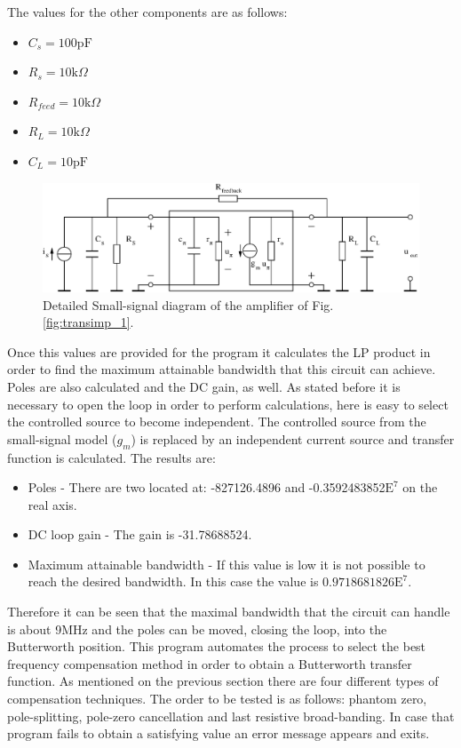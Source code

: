 \documentclass[conference]{IEEEtran}
\begin{document}
The values for the other components are as follows:

\begin{itemize}
\item $C_s=100\text{pF}$
\item $R_s=10\text{k}\Omega$
\item $R_{feed}=10\text{k}\Omega$
\item $R_L=10\text{k}\Omega$
\item $C_L=10\text{pF}$
\end{itemize}
 
\begin{figure}[hbtp]
	\centering
	\includegraphics[scale=.45]{figures/transimp_2.eps}
	\caption{Detailed Small-signal diagram of the amplifier of Fig. \ref{fig:transimp_1}.}
	\label{fig:transimp_2}
\end{figure}

Once this values are provided for the program it calculates the LP product in order to find the maximum attainable bandwidth that this circuit can achieve. Poles are also calculated and the DC gain, as well. As stated before it is necessary to open the loop in order to perform calculations, here is easy to select the controlled source to become independent. The controlled source from the small-signal model ($g_m$) is replaced by an independent current source and transfer function is calculated. The results are:

\begin{itemize}
\item Poles - There are two located at: -827126.4896 and \mbox{-0.3592483852$\text{E}^7$} on the real axis.
\item DC loop gain - The gain is -31.78688524.
\item Maximum attainable bandwidth - If this value is low it is not possible to reach the desired bandwidth. In this case the value is $0.9718681826 \text{E}^7$.
\end{itemize}

Therefore it can be seen that the maximal bandwidth that the circuit can handle is about 9MHz and the poles can be moved, closing the loop, into the Butterworth position. This program automates the process to select the best frequency compensation method in order to obtain a Butterworth transfer function. As mentioned on the previous section there are four different types of compensation techniques. The order to be tested is as follows: phantom zero, pole-splitting, pole-zero cancellation and last resistive broad-banding. In case that program fails to obtain a satisfying value an error message appears and exits.
\end{document}
